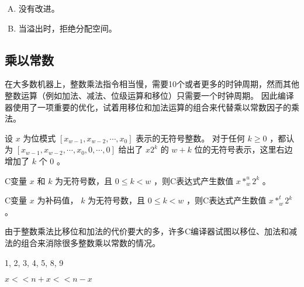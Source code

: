 {{\begin{practicec}
        \end{practicec}

        \begin{practicec}
            \begin{enumerate}[A.]
                \item 没有改进。
                \item 当溢出时，拒绝分配空间。
            \end{enumerate}
        \end{practicec}
    }

    \subsection{乘以常数}
    {
        在大多数机器上，整数乘法指令相当慢，需要10个或者更多的时钟周期，然而其他整数运算（例如加法、减法、位级运算和移位）只需要一个时钟周期。
        因此编译器使用了一项重要的优化，试着用移位和加法运算的组合来代替乘以常数因子的乘法。

        \begin{defines}[乘以2的幂]
            设 $x$ 为位模式 $[x_{w - 1}, x_{w - 2}, \cdots, x_0]$ 表示的无符号整数。
            对于任何 $k \geq 0$ ，都认为 $[x_{w - 1}, x_{w - 2}, \cdots, x_0, 0, \cdots, 0]$ 给出了 $x2^k$ 的 $w + k$ 位的无符号表示，这里右边增加了 $k$ 个 $0$ 。
        \end{defines}

        \begin{defines}[与2的幂相乘的无符号乘法]
            C变量 $x$ 和 $k$ 为无符号数，且 $0 \leq k < w$ ，则C表达式产生数值 $x *_w^u 2^k$ 。
        \end{defines}

        \begin{defines}[与2的幂相乘的补码乘法]
            C变量 $x$ 为补码值， $k$ 为无符号数，且 $0 \leq k < w$ ，则C表达式产生数值 $x *_w^t 2^k$ 。
        \end{defines}

        由于整数乘法比移位和加法的代价要大的多，许多C编译器试图以移位、加法和减法的组合来消除很多整数乘以常数的情况。

        \begin{practicec}
            1, 2, 3, 4, 5, 8, 9
        \end{practicec}

        \begin{practicec}
            $x << n + x << n - x$
        \end{practicec}

}}
